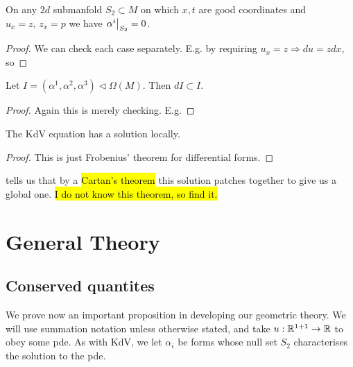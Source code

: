 \documentclass{article}
\begin{document}
\begin{prop}
On any $2d$ submanfold $S_2 \subset M$ on which $x,t$ are good coordinates and $u_x = z, \, z_x = p$ we have $\left. \alpha^i \right\rvert_{S_2}=0$. 
\end{prop}
\begin{proof}
	We can check each case separately. E.g. by requiring $u_x=z \Rightarrow du = zdx$, so 
\end{proof}

\begin{prop}
	Let $I = (\alpha^1,\alpha^2,\alpha^3) \triangleleft \Omega(M)$. Then $dI \subset I$. 
\end{prop}
\begin{proof}
	Again this is merely checking. E.g. 
\end{proof}

\begin{corollary}
	The KdV equation has a solution locally. 
\end{corollary}
\begin{proof}
This is just Frobenius' theorem for differential forms. 
\end{proof}

\begin{remark}
	\cite{Wahlquist1975} tells us that by a \hl{Cartan's theorem} this solution patches together to give us a global one. \hl{I do not know this theorem, so find it. }
\end{remark}

\section{General Theory}
\subsection{Conserved quantites}
We prove now an important proposition in developing our geometric theory. We will use summation notation unless otherwise stated, and take $u: \mathbb{R}^{1+1} \to \mathbb{R}$ to obey some pde. As with KdV, we let $\alpha_i$ be forms whose null set $S_2$ characterises the solution to the pde.  
\end{document}
